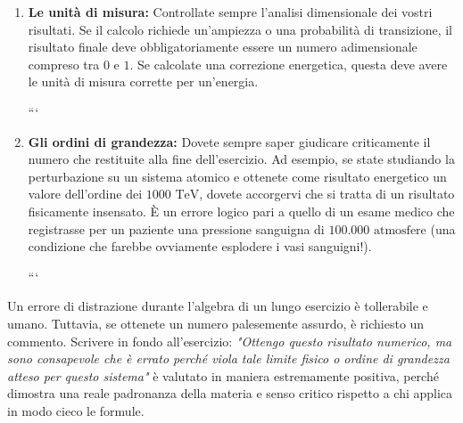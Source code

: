 \begin{enumerate}
\item \textbf{Le unità di misura:} Controllate sempre l'analisi dimensionale dei vostri risultati. Se il calcolo richiede un'ampiezza o una probabilità di transizione, il risultato finale deve obbligatoriamente essere un numero adimensionale compreso tra $0$ e $1$. Se calcolate una correzione energetica, questa deve avere le unità di misura corrette per un'energia.

```
\item \textbf{Gli ordini di grandezza:} Dovete sempre saper giudicare criticamente il numero che restituite alla fine dell'esercizio. Ad esempio, se state studiando la perturbazione su un sistema atomico e ottenete come risultato energetico un valore dell'ordine dei $1000 \text{ TeV}$, dovete accorgervi che si tratta di un risultato fisicamente insensato. È un errore logico pari a quello di un esame medico che registrasse per un paziente una pressione sanguigna di $100.000 \text{ atmosfere}$ (una condizione che farebbe ovviamente esplodere i vasi sanguigni!).

```

\end{enumerate}

Un errore di distrazione durante l'algebra di un lungo esercizio è tollerabile e umano. Tuttavia, se ottenete un numero palesemente assurdo, è richiesto un commento. Scrivere in fondo all'esercizio: \textit{"Ottengo questo risultato numerico, ma sono consapevole che è errato perché viola tale limite fisico o ordine di grandezza atteso per questo sistema"} è valutato in maniera estremamente positiva, perché dimostra una reale padronanza della materia e senso critico rispetto a chi applica in modo cieco le formule.